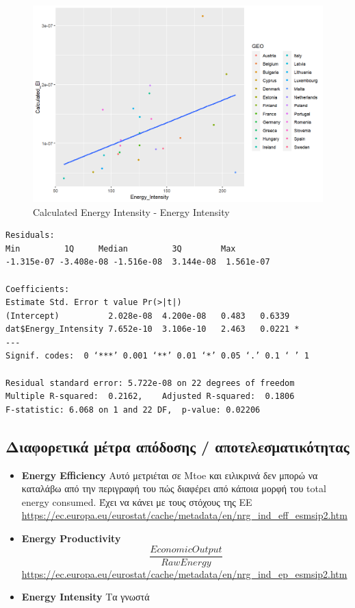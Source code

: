 \documentclass[a4paper,twoside,10pt]{article}
\begin{document}
\begin{figure}[H]
	\centering
	\includegraphics[width=0.7\linewidth]{images/8df6abab-b528-4c7f-a8ff-f985a8085b91}
	\caption{Calculated Energy Intensity - Energy Intensity}
	\label{fig:8df6abab-b528-4c7f-a8ff-f985a8085b91}
\end{figure}
\begin{verbatim}
Residuals:
Min         1Q     Median         3Q        Max 
-1.315e-07 -3.408e-08 -1.516e-08  3.144e-08  1.561e-07 

Coefficients:
Estimate Std. Error t value Pr(>|t|)  
(Intercept)          2.028e-08  4.200e-08   0.483   0.6339  
dat$Energy_Intensity 7.652e-10  3.106e-10   2.463   0.0221 *
---
Signif. codes:  0 ‘***’ 0.001 ‘**’ 0.01 ‘*’ 0.05 ‘.’ 0.1 ‘ ’ 1

Residual standard error: 5.722e-08 on 22 degrees of freedom
Multiple R-squared:  0.2162,	Adjusted R-squared:  0.1806 
F-statistic: 6.068 on 1 and 22 DF,  p-value: 0.02206
\end{verbatim}
\subsection{Διαφορετικά μέτρα απόδοσης / αποτελεσματικότητας}
\begin{itemize}
	\item \textbf{Energy Efficiency} Αυτό μετριέται σε Mtoe και ειλικρινά δεν μπορώ να καταλάβω από την περιγραφή του πώς διαφέρει από κάποια μορφή του total energy consumed. Έχει να κάνει με τους στόχους της EE \url{https://ec.europa.eu/eurostat/cache/metadata/en/nrg_ind_eff_esmsip2.htm} \item \textbf{Energy Productivity}  $$\frac{EconomicOutput}{RawEnergy}$$ \url{https://ec.europa.eu/eurostat/cache/metadata/en/nrg_ind_ep_esmsip2.htm}
	\item \textbf{Energy Intensity} Τα γνωστά
\end{itemize}
\end{document}
